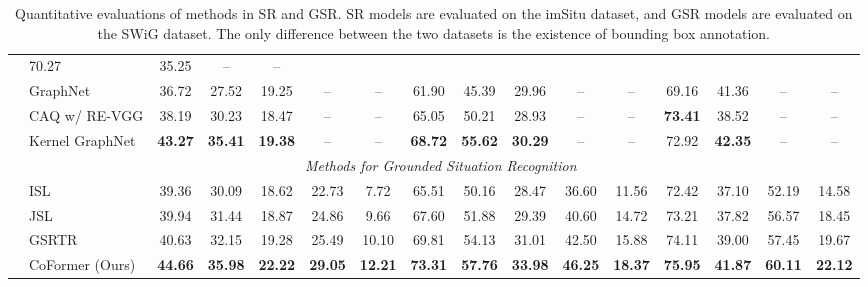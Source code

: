 \begin{table*}[!t]
{\begin{tabular}{l|l|ccccc|ccccc|cccc}
            & 70.27 & 35.25 & -- & --
        \\
            & GraphNet \cite{li2017situation}
            & 36.72 & 27.52 & 19.25 & -- & --
            & 61.90 & 45.39 & 29.96 & -- & --
            & 69.16 & 41.36 & -- & --
        \\
            & CAQ w/ RE-VGG \cite{cooray2020attention}
            & 38.19 & 30.23 & 18.47 & -- & --
            & 65.05 & 50.21 & 28.93 & -- & --
            & \textbf{73.41} & 38.52 & -- & --
        \\
            & Kernel GraphNet \cite{suhail2019mixture}
            & \textbf{43.27} & \textbf{35.41} & \textbf{19.38} & -- & --
            & \textbf{68.72} & \textbf{55.62} & \textbf{30.29} & -- & --
            & 72.92 & \textbf{42.35} & -- & --
        \\
        \cline{2-16}
            & \multicolumn{15}{c}{\textit{Methods for Grounded Situation Recognition}}
        \\
        \cline{2-16}
            & ISL \cite{pratt2020grounded}
            & 39.36 & 30.09 & 18.62 & 22.73 & 7.72
            & 65.51 & 50.16 & 28.47 & 36.60 & 11.56
            & 72.42 & 37.10 & 52.19 & 14.58
        \\
            & JSL \cite{pratt2020grounded}
            & 39.94 & 31.44 & 18.87 & 24.86 & 9.66
            & 67.60 & 51.88 & 29.39 & 40.60 & 14.72
            & 73.21 & 37.82 & 56.57 & 18.45
        \\
            & GSRTR \cite{cho2021gsrtr}
            & 40.63 & 32.15 & 19.28 & 25.49 & 10.10
            & 69.81 & 54.13 & 31.01 & 42.50 & 15.88
            & 74.11 & 39.00 & 57.45 & 19.67
        \\
            & \cellcolor[gray]{0.9}\mbox{CoFormer} (Ours)
            & \cellcolor[gray]{0.9}\textbf{44.66} & \cellcolor[gray]{0.9}\textbf{35.98} & \cellcolor[gray]{0.9}\textbf{22.22} & \cellcolor[gray]{0.9}\textbf{29.05} & \cellcolor[gray]{0.9}\textbf{12.21} 
            & \cellcolor[gray]{0.9}\textbf{73.31} & \cellcolor[gray]{0.9}\textbf{57.76} & \cellcolor[gray]{0.9}\textbf{33.98} & \cellcolor[gray]{0.9}\textbf{46.25} & \cellcolor[gray]{0.9}\textbf{18.37} 
            & \cellcolor[gray]{0.9}\textbf{75.95} & \cellcolor[gray]{0.9}\textbf{41.87} & \cellcolor[gray]{0.9}\textbf{60.11} & \cellcolor[gray]{0.9}\textbf{22.12} 
        \\
        \hline
    \end{tabular}}
    \vspace{-1mm}
    \caption{
        Quantitative evaluations of methods in SR and GSR.
        SR models are evaluated on the imSitu dataset, and GSR models are evaluated on the SWiG dataset.
        The only difference between the two datasets is the existence of bounding box annotation.
    }
    \vspace{-1mm}
    \label{table:result}
\end{table*}

